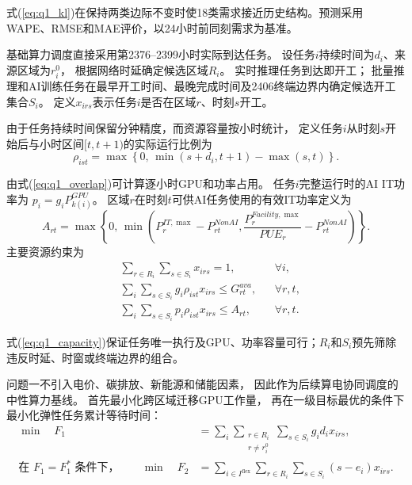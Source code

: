 式(\ref{eq:q1_kl})在保持两类边际不变时使18类需求接近历史结构。预测采用WAPE、RMSE和MAE评价，以24小时前同刻需求为基准。

基础算力调度直接采用第2376--2399小时实际到达任务。
设任务$i$持续时间为$d_i$、来源区域为$r_i^0$，
根据网络时延确定候选区域$R_i$。
实时推理任务到达即开工；
批量推理和AI训练任务在最早开工时间、最晚完成时间及2406终端边界内确定候选开工集合$S_i$。
定义$x_{irs}$表示任务$i$是否在区域$r$、时刻$s$开工。

由于任务持续时间保留分钟精度，而资源容量按小时统计，
定义任务$i$从时刻$s$开始后与小时区间$[t,t+1)$的实际运行比例为
\begin{equation}
	\rho_{ist}
	=
	\max\left\{
	0,\,
	\min(s+d_i,t+1)-\max(s,t)
	\right\}.
	\label{eq:q1_overlap}
\end{equation}

由式(\ref{eq:q1_overlap})可计算逐小时GPU和功率占用。
任务$i$完整运行时的AI IT功率为
$p_i=g_iP^{GPU}_{k(i)}$。
区域$r$在时刻$t$可供AI任务使用的有效IT功率定义为
\[
A_{rt}
=
\max\left\{
0,\,
\min\left(
P^{IT,\max}_r-P^{NonAI}_{rt},
\frac{P^{Facility,\max}_r}{PUE_r}-P^{NonAI}_{rt}
\right)
\right\}.
\]
主要资源约束为
\begin{equation}
	\begin{aligned}
		&\sum_{r\in R_i}\sum_{s\in S_i}x_{irs}=1,
		&&\forall i,\\
		&\sum_i\sum_{s\in S_i}
		g_i\rho_{ist}x_{irs}
		\leq G^{ava}_{rt},
		&&\forall r,t,\\
		&\sum_i\sum_{s\in S_i}
		p_i\rho_{ist}x_{irs}
		\leq A_{rt},
		&&\forall r,t .
	\end{aligned}
	\label{eq:q1_capacity}
\end{equation}

式(\ref{eq:q1_capacity})保证任务唯一执行及GPU、功率容量可行；$R_i$和$S_i$预先筛除违反时延、时窗或终端边界的组合。

问题一不引入电价、碳排放、新能源和储能因素，
因此作为后续算电协同调度的中性算力基线。
首先最小化跨区域迁移GPU工作量，
再在一级目标最优的条件下最小化弹性任务累计等待时间：
\begin{equation}
	\begin{aligned}
		\min\quad
		F_1
		&=
		\sum_i
		\sum_{\substack{r\in R_i\\r\neq r_i^0}}
		\sum_{s\in S_i}
		g_id_ix_{irs},\\
		\text{在 }F_1=F_1^{*}\text{ 条件下，}\qquad
		\min\quad
		F_2
		&=
		\sum_{i\in I^{\mathrm{flex}}}
		\sum_{r\in R_i}\sum_{s\in S_i}
		(s-e_i)x_{irs}.
	\end{aligned}
	\label{eq:q1_objective}
\end{equation}

